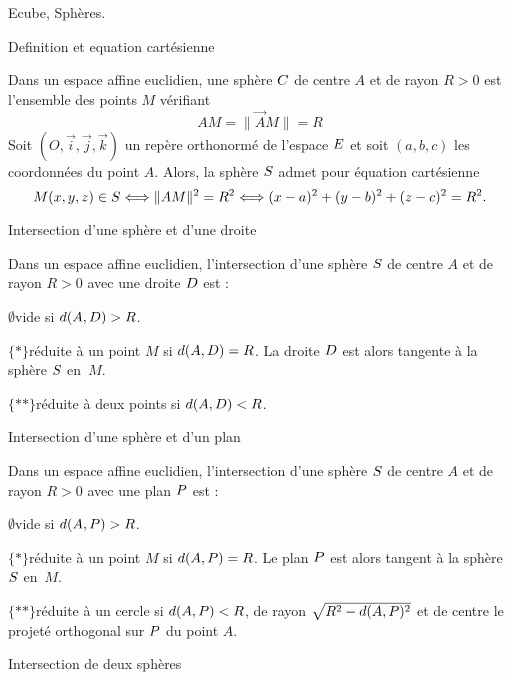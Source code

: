 \Subsection Ecube, Sph\`eres.

\Concept [] Definition et equation cart\'esienne

\Definition []  Dans un espace affine euclidien, une sph\`ere $\sc C$ de centre $A$ et de rayon $R>0$ est l'ensemble des points $M$ 
v\'erifiant 
$$
AM=\|\vec AM\|=R
$$
Soit $(O,\vec i,\vec j,\vec k)$ un rep\`ere orthonorm\'e de l'espace $\sc E$ et soit $(a,b,c)$ les coordonn\'ees du point $A$. 
Alors, la sph\`ere $\sc S$ admet pour \'equation cart\'esienne 
$$
M(x,y,z)\in\sc S\Longleftrightarrow \|AM\|^2=R^2\Longleftrightarrow (x-a)^2+(y-b)^2+(z-c)^2=R^2.
$$

\Concept [] Intersection d'une sph\`ere et d'une droite

\noindent
Dans un espace affine euclidien, l'intersection d'une sph\`ere $\sc S$ de centre $A$ et de rayon $R>0$ avec une droite $\sc D$ est :
\medskip

\noindent
\item{$\emptyset$}vide si $d(A,\sc D)>R$. 
\medskip

\noindent
\item{$\{*\}$}r\'eduite \`a un point $M$ si $d(A,\sc D)=R$. La droite $\sc D$ est alors tangente \`a la sph\`ere $\sc S$ en~$M$. 
\medskip

\noindent
\item{$\{**\}$}r\'eduite \`a deux points si $d(A,\sc D)<R$. 
\medskip


\Concept [] Intersection d'une sph\`ere et d'un plan

\noindent
Dans un espace affine euclidien, l'intersection d'une sph\`ere $\sc S$ de centre $A$ et de rayon $R>0$ avec une plan $\sc P$ est :
\medskip

\noindent
\item{$\emptyset$}vide si $d(A,\sc P)>R$. 
\medskip

\noindent
\item{$\{*\}$}r\'eduite \`a un point $M$ si $d(A,\sc P)=R$. Le plan $\sc P$ est alors tangent \`a la sph\`ere $\sc S$ en~$M$. 
\medskip

\noindent
\item{$\{**\}$}r\'eduite \`a un cercle si $d(A,\sc P)<R$, de rayon $\sqrt{R^2-d(A,\sc P)^2}$ et de centre le projet\'e orthogonal sur $\sc P$ du point $A$. 
\medskip

\Concept [] Intersection de deux sph\`eres

